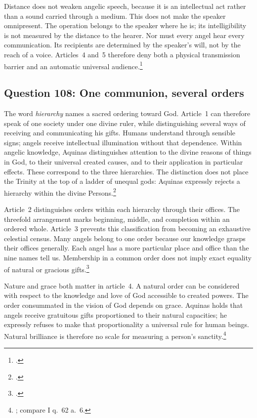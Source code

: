 Distance does not weaken angelic speech, because it is an intellectual act rather than a sound carried through a medium. This does not make the speaker omnipresent. The operation belongs to the speaker where he is; its intelligibility is not measured by the distance to the hearer. Nor must every angel hear every communication. Its recipients are determined by the speaker's will, not by the reach of a voice. Articles~4 and~5 therefore deny both a physical transmission barrier and an automatic universal audience.\footnote{.}


\subsection{Question 108: One communion, several orders}\label{q108}
The word \emph{hierarchy} names a sacred ordering toward God. Article~1 can therefore speak of one society under one divine ruler, while distinguishing several ways of receiving and communicating his gifts. Humans understand through sensible signs; angels receive intellectual illumination without that dependence. Within angelic knowledge, Aquinas distinguishes attention to the divine reasons of things in God, to their universal created causes, and to their application in particular effects. These correspond to the three hierarchies. The distinction does not place the Trinity at the top of a ladder of unequal gods: Aquinas expressly rejects a hierarchy within the divine Persons.\footnote{.}

Article~2 distinguishes orders within each hierarchy through their offices. The threefold arrangement marks beginning, middle, and completion within an ordered whole. Article~3 prevents this classification from becoming an exhaustive celestial census. Many angels belong to one order because our knowledge grasps their offices generally. Each angel has a more particular place and office than the nine names tell us. Membership in a common order does not imply exact equality of natural or gracious gifts.\footnote{.}

Nature and grace both matter in article~4. A natural order can be considered with respect to the knowledge and love of God accessible to created powers. The order consummated in the vision of God depends on grace. Aquinas holds that angels receive gratuitous gifts proportioned to their natural capacities; he expressly refuses to make that proportionality a universal rule for human beings. Natural brilliance is therefore no scale for measuring a person's sanctity.\footnote{; compare I q.~62 a.~6.}

